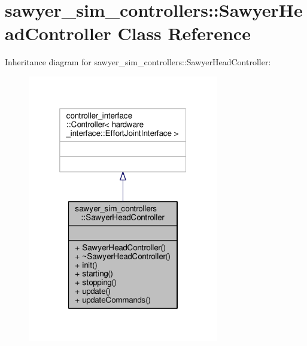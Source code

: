 \hypertarget{classsawyer__sim__controllers_1_1_sawyer_head_controller}{\section{sawyer\-\_\-sim\-\_\-controllers\-:\-:Sawyer\-Head\-Controller Class Reference}
\label{classsawyer__sim__controllers_1_1_sawyer_head_controller}
}


Inheritance diagram for sawyer\-\_\-sim\-\_\-controllers\-:\-:Sawyer\-Head\-Controller\-:\nopagebreak
\begin{figure}[H]
\begin{center}
\leavevmode
\includegraphics[width=236pt]{classsawyer__sim__controllers_1_1_sawyer_head_controller__inherit__graph}
\end{center}
\end{figure}


